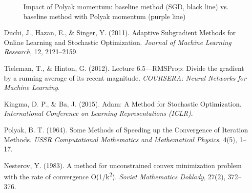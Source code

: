 \documentclass[12pt]{article}
\begin{document}
\begin{figure}[htbp]
    \caption{Impact of Polyak momentum: baseline method (SGD, black line) vs. baseline method with Polyak momentum (purple line)}
    \label{fig:polyak_momentum_study}
\end{figure}



\clearpage
\begin{thebibliography}{99}

Duchi, J., Hazan, E., \& Singer, Y. (2011). 
Adaptive Subgradient Methods for Online Learning and Stochastic Optimization. 
\textit{Journal of Machine Learning Research}, 12, 2121–2159.

Tieleman, T., \& Hinton, G. (2012). 
Lecture 6.5—RMSProp: Divide the gradient by a running average of its recent magnitude. 
\textit{COURSERA: Neural Networks for Machine Learning}.

Kingma, D. P., \& Ba, J. (2015). 
Adam: A Method for Stochastic Optimization. 
\textit{International Conference on Learning Representations (ICLR)}.

Polyak, B. T. (1964). 
Some Methods of Speeding up the Convergence of Iteration Methods. 
\textit{USSR Computational Mathematics and Mathematical Physics}, 4(5), 1–17.

Nesterov, Y. (1983). 
A method for unconstrained convex minimization problem with the rate of convergence O(1/k\textsuperscript{2}). 
\textit{Soviet Mathematics Doklady}, 27(2), 372–376.

\end{thebibliography}
\end{document}
